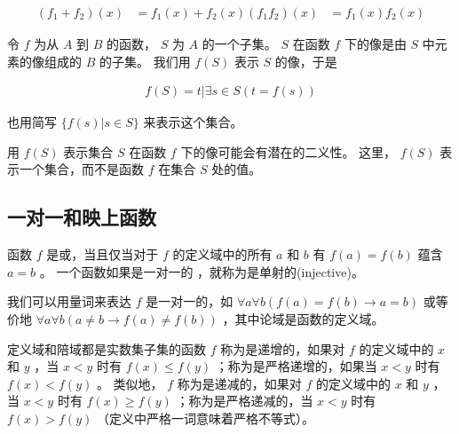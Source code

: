 {{\begin{defines}
            \begin{align*}
                (f_1 + f_2)(x) &= f_1(x) + f_2(x)
                (f_1f_2)(x) &= f_1(x)f_2(x)
            \end{align*}
        \end{defines}

        \begin{defines}
            令 $f$ 为从 $A$ 到 $B$ 的函数， $S$ 为 $A$ 的一个子集。
            $S$ 在函数 $f$ 下的像是由 $S$ 中元素的像组成的 $B$ 的子集。
            我们用 $f(S)$ 表示 $S$ 的像，于是

            \begin{align*}
                f(S) = {t | \exists s \in S (t = f(s))}
            \end{align*}

            也用简写 $\{f(s) | s \in S\}$ 来表示这个集合。
        \end{defines}

        \begin{defines}
            用 $f(S)$ 表示集合 $S$ 在函数 $f$ 下的像可能会有潜在的二义性。
            这里， $f(S)$ 表示一个集合，而不是函数 $f$ 在集合 $S$ 处的值。
        \end{defines}
    }

    \subsection{一对一和映上函数}
    {
        \begin{defines}
            函数 $f$ 是或，当且仅当对于 $f$ 的定义域中的所有 $a$ 和 $b$ 有 $f(a) = f(b)$ 蕴含 $a = b$ 。
            一个函数如果是一对一的 ，就称为是单射的(injective)。
        \end{defines}

        \begin{defines}
            我们可以用量词来表达 $f$ 是一对一的，如 $\forall a \forall b (f(a) = f(b) \rightarrow a = b)$ 或等价地 $\forall a \forall b (a \neq b \rightarrow f(a) \neq f(b))$ ，其中论域是函数的定义域。
        \end{defines}

        \begin{defines}
            定义域和陪域都是实数集子集的函数 $f$ 称为是递增的，如果对 $f$ 的定义域中的 $x$ 和 $y$ ，当 $x < y$ 时有 $f(x) \leq f(y)$ ；称为是严格递增的，如果当 $x < y$ 时有 $f(x) < f(y)$ 。
            类似地， $f$ 称为是递减的，如果对 $f$ 的定义域中的 $x$ 和 $y$ ，当 $x < y$ 时有 $f(x) \geq f(y)$ ；称为是严格递减的，当 $x < y$ 时有 $f(x) > f(y)$ （定义中严格一词意味着严格不等式）。
        \end{defines}

}}
